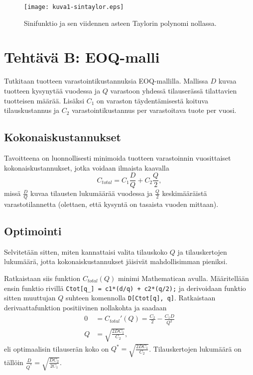 \documentclass[a4paper,11pt]{article}
\begin{document}
{\begin{figure}[!htb]
    \centering
    \texttt{[image: kuva1-sintaylor.eps]}
    \caption{Sinifunktio ja sen viidennen asteen Taylorin polynomi nollassa.}
    \label{fig:sinitaylor}
\end{figure}

\clearpage

\section{Tehtävä B: EOQ-malli}

Tutkitaan tuotteen varastointikustannuksia EOQ-mallilla. Mallissa $D$ kuvaa tuotteen kysynytää vuodessa ja $Q$ varastoon yhdessä tilauserässä tilattavien tuotteisen määrää. Lisäksi $C_1$ on varaston täydentämisestä koituva tilauskustannus ja $C_2$ varastointikustannus per varastoitava tuote per vuosi.

\subsection{Kokonaiskustannukset}

Tavoitteena on luonnollisesti minimoida tuotteen varastoinnin vuosittaiset kokonaiskustannukset, jotka voidaan ilmaista kaavalla
\begin{equation*}
    C_{total}= C_1 \frac{D}{Q} + C_2 \frac{Q}{2},
\end{equation*}
missä $ \frac{D}{Q}$ kuvaa tilausten lukumäärää vuodessa ja $\frac{Q}{2}$ keskimääräistä varastotilannetta (olettaen, että kysyntä on tasaista vuoden mittaan).

\subsection{Optimointi}

Selvitetään sitten, miten kannattaisi valita tilauskoko $Q$ ja tilauskertojen lukumäärä, jotta kokonaiskustannukset jäisivät mahdollisimman pieniksi.

Ratkaistaan siis funktion $C_{total}(Q)$ minimi Mathematican avulla. Määritellään ensin funktio rivillä \texttt{Ctot[q\_] = c1*(d/q) + c2*(q/2);} ja derivoidaan funktio sitten muuttujan $Q$ suhteen komennolla \texttt{D[Ctot[q], q]}. Ratkaistaan derivaattafunktion positiivinen nollakohta ja saadaan
\begin{align}
    0 & = C_{total}'(Q) = \frac{C_2}{2}-\frac{C_1 D}{Q^2}\\
    Q & = \sqrt{\frac{2DC_1}{C_2}},
\end{align}
eli optimaalisin tilauserän koko on $Q^*=\sqrt{\frac{2DC_1}{C_2}}$. Tilauskertojen lukumäärä on tällöin $\frac{D}{Q^*}=\sqrt{\frac{DC_2}{2C_1}}$.

}
\end{document}
